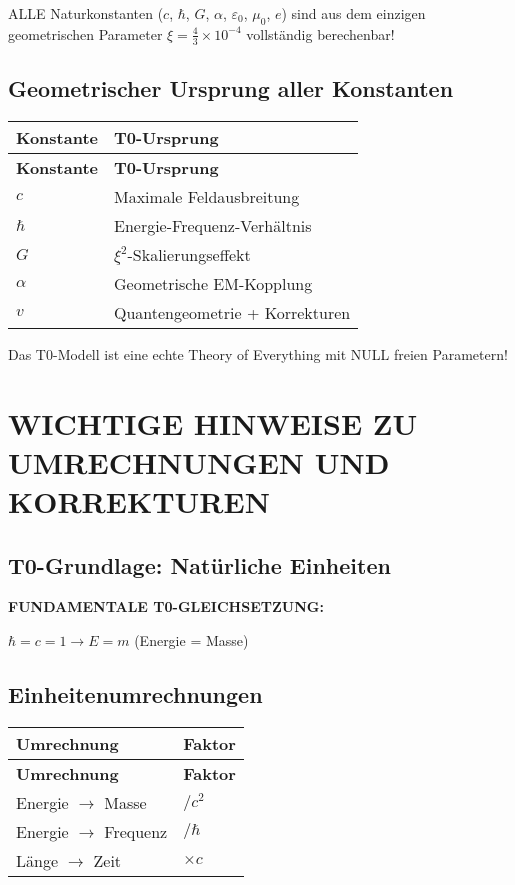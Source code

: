 \documentclass[12pt,a4paper]{article}
\begin{document}
	ALLE Naturkonstanten (\(c\), \(\hbar\), \(G\), \(\alpha\), \(\varepsilon_0\), \(\mu_0\), \(e\)) sind aus dem einzigen geometrischen Parameter \(\xi = \frac{4}{3} \times 10^{-4}\) vollständig berechenbar!
	
	\subsection{Geometrischer Ursprung aller Konstanten}
	
	\begin{longtable}{|p{3cm}|p{5cm}|}
		\hline
		\textbf{Konstante} & \textbf{T0-Ursprung} \\
		\hline
		\endfirsthead
		\hline
		\textbf{Konstante} & \textbf{T0-Ursprung} \\
		\hline
		\endhead
		\(c\) & Maximale Feldausbreitung \\
		\hline
		\(\hbar\) & Energie-Frequenz-Verhältnis \\
		\hline
		\(G\) & \(\xi^{2}\)-Skalierungseffekt \\
		\hline
		\(\alpha\) & Geometrische EM-Kopplung \\
		\hline
		\(v\) & Quantengeometrie + Korrekturen \\
		\hline
	\end{longtable}
	
	Das T0-Modell ist eine echte Theory of Everything mit NULL freien Parametern!
	
	\section{WICHTIGE HINWEISE ZU UMRECHNUNGEN UND KORREKTUREN}
	
	\subsection{T0-Grundlage: Natürliche Einheiten}
	
	\textbf{FUNDAMENTALE T0-GLEICHSETZUNG:}
	\begin{center}
		\(\hbar = c = 1 \rightarrow E = m\) (Energie = Masse)
	\end{center}
	
	\subsection{Einheitenumrechnungen}
	
	\begin{longtable}{|p{3cm}|p{3cm}|}
		\hline
		\textbf{Umrechnung} & \textbf{Faktor} \\
		\hline
		\endfirsthead
		\hline
		\textbf{Umrechnung} & \textbf{Faktor} \\
		\hline
		\endhead
		Energie \(\rightarrow\) Masse & \(/c^{2}\) \\
		\hline
		Energie \(\rightarrow\) Frequenz & \(/\hbar\) \\
		\hline
		Länge \(\rightarrow\) Zeit & \(\times c\) \\
		\hline
	\end{longtable}
	
\end{document}
